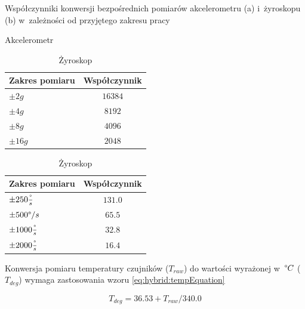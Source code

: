 \begin{savenotes}
	\begin{table}[!htb]
		\caption[Współczynniki konwersji bezpośrednich pomiarów akcelerometru (a) i~żyroskopu (b) w~zależności od przyjętego zakresu pracy]{Współczynniki konwersji bezpośrednich pomiarów akcelerometru (a) i~żyroskopu (b) w~zależności od przyjętego zakresu pracy}
		\begin{subtable}{.5\linewidth}
			\centering
			\caption{Akcelerometr}
			\label{tab:hybrid:accRangeFactors} 
			\begin{tabular}{|l|c|}
				\hline
				Zakres pomiaru              & Współczynnik \\ \hline
				$\pm2g$                     & $16384$        \\ \hline
				\rowcolor{black!20} $\pm4g$ & $8192$         \\ \hline
				$\pm8g$                     & $4096$         \\ \hline
				$\pm16g$                    & $2048$         \\ \hline
			\end{tabular}
		\end{subtable}%
		\begin{subtable}{.5\linewidth}
			\centering
			\caption{Żyroskop}
			\label{tab:hybrid:gyroRangeFactors}	
			\begin{tabular}{|l|c|}
				\hline
				Zakres pomiaru                        & Współczynnik \\ \hline
				$\pm250\frac{\degree}{s}$             & $131.0$        \\ \hline
				\rowcolor{black!20} $\pm500\degree/s$ & $65.5$         \\ \hline
				$\pm1000\frac{\degree}{s}$            & $32.8$         \\ \hline
				$\pm2000\frac{\degree}{s}$            & $16.4$         \\ \hline
			\end{tabular}
		\end{subtable} 
	\end{table}
\end{savenotes}	
		
		
Konwersja pomiaru temperatury czujników ($T_{raw}$) do wartości wyrażonej w~$\degree C$ ($T_{deg}$) wymaga zastosowania wzoru \ref{eq:hybrid:tempEquation}

\begin{equation}
	T_{deg} = 36.53 + T_{raw} / 340.0
	\label{eq:hybrid:tempEquation}
\end{equation}

